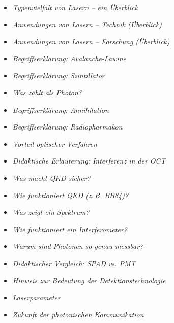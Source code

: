 \begin{tcolorbox}[title=didaktische Boxen, didaktikbox]
	\begin{itemize}
		\item \emph{Typenvielfalt von Lasern – ein Überblick} \dotfill\pageref{box:Typenvielfalt von Lasern}
		\item \emph{Anwendungen von Lasern  –  Technik (Überblick)} \dotfill\pageref{box:lasertechnik}
		\item \emph{Anwendungen von Lasern  –  Forschung (Überblick)}\dotfill\pageref{box:laser-app-forschung}
		\item \emph{Begriffserklärung: Avalanche-Lawine} \dotfill\pageref{box:avalanche}
		\item \emph{Begriffserklärung: Szintillator} \dotfill\pageref{box:szintillator}
		\item \emph{Was zählt als Photon?} \dotfill\pageref{box:photonenzaehlung}
		\item \emph{Begriffserklärung: Annihilation} \dotfill\pageref{box:annihilation}
		\item \emph{Begriffserklärung: Radiopharmakon} \dotfill\pageref{box:radiopharmakon}
		\item \emph{Vorteil optischer Verfahren} \dotfill\pageref{box:optisches Verfahren}
		\item \emph{Didaktische Erläuterung: Interferenz in der OCT} \dotfill\pageref{box:interferenz_oct}
		\item \emph{Was macht QKD sicher?} \dotfill\pageref{box:qkd}
		\item \emph{Wie funktioniert QKD (z.\,B. BB84)?} \dotfill\pageref{box:wie funktioniert QKD}
		\item \emph{Was zeigt ein Spektrum?} \dotfill\pageref{box:was zeigt spektrum}
		\item \emph{Wie funktioniert ein Interferometer?}\dotfill\pageref{box:interferometer}
		\item \emph{Warum sind Photonen so genau messbar?} \dotfill\pageref{box:photonen_genau}
	\end{itemize}
\end{tcolorbox}
\medskip
\begin{tcolorbox}[title=Hinweis-Boxen, hinweisbox]
	\begin{itemize}
		\item \emph{Didaktischer Vergleich: SPAD vs. PMT} \dotfill\pageref{box:vergleich SPAD}
		\item \emph{Hinweis zur Bedeutung der Detektionstechnologie} \dotfill\pageref{box:detektionstechnologie}
		\item \emph{Laserparameter}\dotfill\pageref{box:laserparameter}
		\item \emph{Zukunft der photonischen Kommunikation} \dotfill\pageref{box:Zukunft Kommunikation}
	\end{itemize}
\end{tcolorbox}




